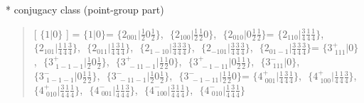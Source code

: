 \documentclass[fleqn,10pt,landscape]{jsarticle}
\begin{document}
* conjugacy class (point-group part)
\begin{quote}
[ $\{1|0\}$ ] = \quad $\{1|0\}$ = \quad $\{2{}_{001}|\frac{1}{2} 0 \frac{1}{2}\}$,\,\, $\{2{}_{100}|\frac{1}{2} \frac{1}{2} 0\}$,\,\, $\{2{}_{010}|0 \frac{1}{2} \frac{1}{2}\}$ = \quad $\{2{}_{110}|\frac{3}{4} \frac{1}{4} \frac{1}{4}\}$,\,\, $\{2{}_{101}|\frac{1}{4} \frac{1}{4} \frac{3}{4}\}$,\,\, $\{2{}_{011}|\frac{1}{4} \frac{3}{4} \frac{1}{4}\}$,\,\, $\{2{}_{1-10}|\frac{3}{4} \frac{3}{4} \frac{3}{4}\}$,\,\, $\{2{}_{-101}|\frac{3}{4} \frac{3}{4} \frac{3}{4}\}$,\,\, $\{2{}_{01-1}|\frac{3}{4} \frac{3}{4} \frac{3}{4}\}$\newline[ $\{3^{+}_{\,\,111}|0\}$ ] = \quad $\{3^{+}_{\,\,111}|0\}$,\,\, $\{3^{+}_{\,\,1-1-1}|\frac{1}{2} 0 \frac{1}{2}\}$,\,\, $\{3^{+}_{\,\,-11-1}|\frac{1}{2} \frac{1}{2} 0\}$,\,\, $\{3^{+}_{\,\,-1-11}|0 \frac{1}{2} \frac{1}{2}\}$,\,\, $\{3^{-}_{\,\,111}|0\}$,\,\, $\{3^{-}_{\,\,1-1-1}|0 \frac{1}{2} \frac{1}{2}\}$,\,\, $\{3^{-}_{\,\,-11-1}|\frac{1}{2} 0 \frac{1}{2}\}$,\,\, $\{3^{-}_{\,\,-1-11}|\frac{1}{2} \frac{1}{2} 0\}$ = \quad $\{4^{+}_{\,\,001}|\frac{1}{4} \frac{3}{4} \frac{1}{4}\}$,\,\, $\{4^{+}_{\,\,100}|\frac{1}{4} \frac{1}{4} \frac{3}{4}\}$,\,\, $\{4^{+}_{\,\,010}|\frac{3}{4} \frac{1}{4} \frac{1}{4}\}$,\,\, $\{4^{-}_{\,\,001}|\frac{1}{4} \frac{1}{4} \frac{3}{4}\}$,\,\, $\{4^{-}_{\,\,100}|\frac{3}{4} \frac{1}{4} \frac{1}{4}\}$,\,\, $\{4^{-}_{\,\,010}|\frac{1}{4} \frac{3}{4} \frac{1}{4}\}$\newline
\end{quote}
\end{document}

